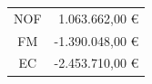 \begin{table}[h]
    \centering
    \begin{tabular}{|c|r|}
        \hline
        NOF & 1.063.662,00 € \\
        FM & -1.390.048,00 € \\
        EC & -2.453.710,00 € \\
        \hline
    \end{tabular}
\end{table}